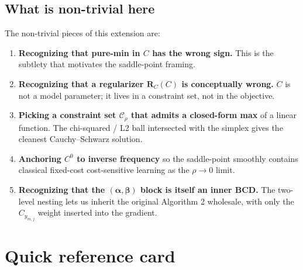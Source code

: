 \documentclass[11pt,a4paper]{article}
\begin{document}
\subsection{What is non-trivial here}

The non-trivial pieces of this extension are:

\begin{enumerate}[leftmargin=*,itemsep=2pt]
  \item \textbf{Recognizing that pure-min in $C$ has the wrong sign.} This is the subtlety that motivates the saddle-point framing.
  \item \textbf{Recognizing that a regularizer $\mathbf{R}_C(C)$ is conceptually wrong.} $C$ is not a model parameter; it lives in a constraint set, not in the objective.
  \item \textbf{Picking a constraint set $\mathcal{C}_\rho$ that admits a closed-form max} of a linear function. The chi-squared / L2 ball intersected with the simplex gives the cleanest Cauchy--Schwarz solution.
  \item \textbf{Anchoring $C^0$ to inverse frequency} so the saddle-point smoothly contains classical fixed-cost cost-sensitive learning as the $\rho \to 0$ limit.
  \item \textbf{Recognizing that the $(\boldsymbol{\alpha}, \boldsymbol{\beta})$ block is itself an inner BCD.} The two-level nesting lets us inherit the original Algorithm 2 wholesale, with only the $C_{y_{m,j}}$ weight inserted into the gradient.
\end{enumerate}

\section{Quick reference card}
\end{document}
